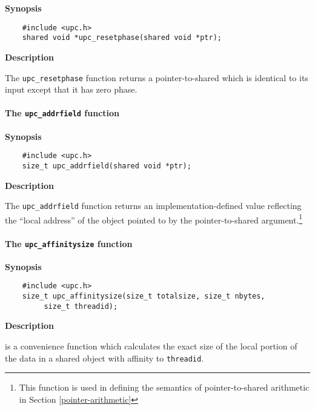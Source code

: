 {\bf Synopsis} 

\npf\vspace{-2.5em}
\begin{verbatim}
    #include <upc.h> 
    shared void *upc_resetphase(shared void *ptr); 
\end{verbatim}

{\bf Description}

\np The {\tt upc\_resetphase} function returns a pointer-to-shared
    which is identical to its input except that it has zero phase. 

\paragraph{The {\tt upc\_addrfield} function}
\label{upc_addrfield}

{\bf Synopsis} 

\npf\vspace{-2.5em}

\begin{verbatim}
    #include <upc.h> 
    size_t upc_addrfield(shared void *ptr); 
\end{verbatim}

{\bf Description}

\np The {\tt upc\_addrfield} function returns an
   implementation-defined value reflecting the ``local address'' of the
   object pointed to by the pointer-to-shared argument.\footnote{%
   This function is used in defining the semantics of pointer-to-shared
   arithmetic in Section \ref{pointer-arithmetic}}

   
\paragraph{The {\tt upc\_affinitysize} function}

{\bf Synopsis} 

\npf\vspace{-2.5em}
\begin{verbatim}
    #include <upc.h> 
    size_t upc_affinitysize(size_t totalsize, size_t nbytes, 
         size_t threadid);
\end{verbatim}

{\bf Description}

 is a convenience function which 
    calculates the exact size of the local portion of the data in a 
    shared object with affinity to {\tt threadid}.
    
